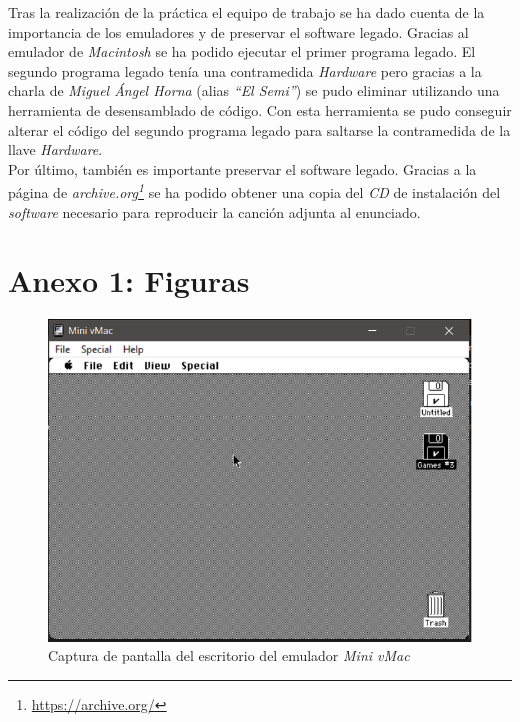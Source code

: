 \documentclass{article}
\begin{document}
Tras la realización de la práctica el equipo de trabajo se ha dado cuenta de la importancia de los emuladores y de preservar el software legado. Gracias al emulador de \textit{Macintosh} se ha podido ejecutar el primer programa legado. El segundo programa legado tenía una contramedida \textit{Hardware} pero gracias a la charla de \textit{Miguel Ángel Horna} (alias \textit{``El Semi''}) se pudo eliminar utilizando una herramienta de desensamblado de código. Con esta herramienta se pudo conseguir alterar el código del segundo programa legado para saltarse la contramedida de la llave \textit{Hardware}.\\
Por último, también es importante preservar el software legado. Gracias a la página de \textit{archive.org\footnote{\url{https://archive.org/}}} se ha podido obtener una copia del \textit{CD} de instalación del \textit{software} necesario para reproducir la canción adjunta al enunciado.\\


\newpage
\section*{Anexo 1: Figuras}

\begin{figure}[h!]
    \centering
    \includegraphics[width=0.8\columnwidth]{images/emuladorEscritorio.png}
    \caption{Captura de pantalla del escritorio del emulador \textit{Mini vMac}}
    \label{fig:emuladorEscritorio}
\end{figure}
\end{document}
